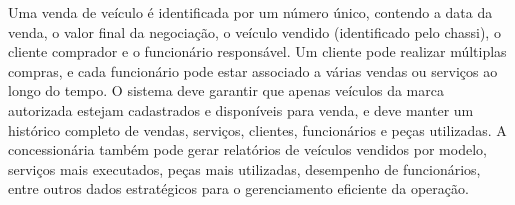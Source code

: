 \documentclass{article}
\begin{document}
Uma venda de veículo é identificada por um número único, contendo a data da venda, o valor final da negociação, o veículo vendido (identificado pelo chassi), o cliente comprador e o funcionário responsável. Um cliente pode realizar múltiplas compras, e cada funcionário pode estar associado a várias vendas ou serviços ao longo do tempo.
O sistema deve garantir que apenas veículos da marca autorizada estejam cadastrados e disponíveis para venda, e deve manter um histórico completo de vendas, serviços, clientes, funcionários e peças utilizadas. A concessionária também pode gerar relatórios de veículos vendidos por modelo, serviços mais executados, peças mais utilizadas, desempenho de funcionários, entre outros dados estratégicos para o gerenciamento eficiente da operação.


\newpage
\end{document}
